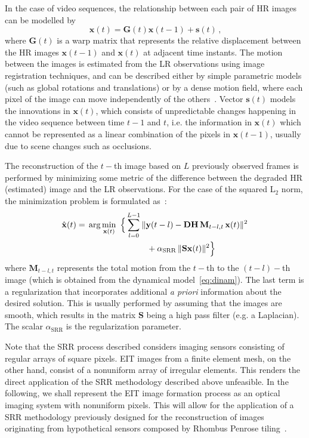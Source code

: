 \documentclass[10pt]{IEEEtran}
\newcommand{\vs}{\mathbf{s}}
\newcommand{\vx}{\mathbf{x}}
\newcommand{\vxh}{\hat{\mathbf{x}}}
\newcommand{\vy}{\mathbf{y}}
\newcommand{\mG}{\mathbf{G}}
\newcommand{\mD}{\mathbf{D}}
\newcommand{\mS}{\mathbf{S}}
\newcommand{\mH}{\mathbf{H}}
\newcommand{\mM}{\mathbf{M}}
\begin{document}
In the case of video sequences, the relationship between each pair of HR images can be modelled by~\cite{Elad99}
\begin{equation}\label{eq:dinam}
    \vx(t) = \mG(t) \vx(t-1) + \vs(t)
    \,\text{,}
\end{equation}
where $\mG(t)$ is a warp matrix that represents the relative displacement between the HR images $\vx(t-1)$ and $\vx(t)$ at adjacent time instants.
%
The motion between the images is estimated from the LR observations using image registration techniques, and can be described either by simple parametric models (such as global rotations and translations) or by a dense motion field, where each pixel of the image can move independently of the others~\cite{Sun10}.
%
Vector $\vs(t)$ models the innovations in $\vx(t)$, which consists of unpredictable changes happening in the video sequence between time $t-1$ and $t$, i.e. the information in $\vx(t)$ which cannot be represented as a linear combination of the pixels in $\vx(t-1)$, usually due to scene changes such as occlusions.





The reconstruction of the $t-$th image based on $L$ previously observed frames is performed by minimizing some metric of the difference between the degraded HR (estimated) image and the LR observations.
%
For the case of the squared L$_2$ norm, the minimization problem is formulated as~\cite{Nasrollahi14}:
%
\begin{align}
    \vxh(t) {}={} & \arg\min_{\vx(t)} \,\, \Big\{ \sum_{l=0}^{L-1} \|\vy(t-l)-\mD\mH\,\mM_{t-l,t}\,\vx(t)\|^2
    \nonumber\\ & \hspace{2.5cm}
    + \alpha_{\text{SRR}}\,\|\mS\vx(t)\|^2 \Big\}
\end{align}
where $\mM_{t-l,t}$ represents the total motion from the $t-$th to the $(t-l)-$th image (which is obtained from the dynamical model~\eqref{eq:dinam}).
%
The last term is a regularization that incorporates additional \textit{a priori} information about the desired solution.
%
This is usually performed by assuming that the images are smooth, which results in the matrix $\mS$ being a high pass filter (e.g. a Laplacian). The scalar $\alpha_{\text{SRR}}$ is the regularization parameter.







Note that the SRR process described considers imaging sensors consisting of regular arrays of square pixels.
%
EIT images from a finite element mesh, on the other hand, consist of a nonuniform array of irregular elements.
%
This renders the direct application of the SRR methodology described above unfeasible.
%
In the following, we shall represent the EIT image formation process as an optical imaging system with nonuniform pixels.
%
This will allow for the application of a SRR methodology previously designed for the reconstruction of images originating from hypothetical sensors composed by Rhombus Penrose tiling~\cite{Ben11,Penrose74}.
\end{document}
